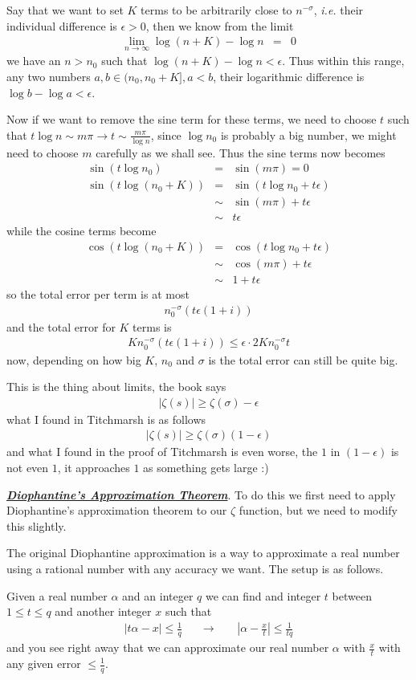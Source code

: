 \documentclass[aps,preprint,preprintnumbers,nofootinbib,showpacs,prd]{revtex4-1}
\newcommand{\ie}{{\it i.e.} }
\newcommand{\nbea}{\begin{eqnarray*}}
\newcommand{\neea}{\end{eqnarray*}}
\begin{document}
Say that we want to set $K$ terms to be arbitrarily close to $n^{-\sigma}$, \ie their individual difference is $\epsilon > 0$, then we know from the limit
%
\nbea
\lim_{n\to\infty} \log (n + K) - \log n & = & 0
\neea
%
we have an $n > n_0$ such that $\log (n + K) - \log n < \epsilon$. Thus within this range, any two numbers $a,b \in (n_0, n_0 + K], a < b$, their logarithmic difference is $\log b - \log a < \epsilon$.

Now if we want to remove the sine term for these terms, we need to choose $t$ such that $t \log n \sim m\pi \to t \sim\frac{m\pi}{\log n}$, since $\log n_0$ is probably a big number, we might need to choose $m$ carefully as we shall see. Thus the sine terms now becomes
%
\nbea
\sin(t \log n_0) & = & \sin (m\pi) = 0 \\
\sin(t \log (n_0 + K)) & = & \sin (t \log n_0 + t\epsilon) \\
& \sim & \sin(m\pi) + t\epsilon \\
& \sim & t\epsilon
\neea
%
while the cosine terms become
%
\nbea
\cos(t \log (n_0 + K)) & = & \cos(t \log n_0 + t\epsilon) \\
& \sim & \cos(m\pi) + t\epsilon \\
& \sim & 1 + t\epsilon
\neea
%
so the total error per term is at most
%
\nbea
n_0^{-\sigma}(t\epsilon(1 + i))
\neea
%
and the total error for $K$ terms is
%
\nbea
K n_0^{-\sigma}(t\epsilon(1 + i)) \le \epsilon \cdot 2 K n_0^{-\sigma} t 
\neea
%
now, depending on how big $K$, $n_0$ and $\sigma$ is the total error can still be quite big.







This is the thing about limits, the book says
%
\nbea
|\zeta(s)| \ge \zeta(\sigma) - \epsilon
\neea
%
what I found in Titchmarsh is as follows
%
\nbea
|\zeta(s)| \ge \zeta(\sigma)(1 - \epsilon)
\neea
%
and what I found in the proof of Titchmarsh is even worse, the $1$ in $(1 - \epsilon)$ is not even $1$, it approaches $1$ as something gets large :)

\underline{\textbf{\textit{Diophantine's Approximation Theorem}}}. To do this we first need to apply Diophantine's approximation theorem to our $\zeta$ function, but we need to modify this slightly.

The original Diophantine approximation is a way to approximate a real number using a rational number with any accuracy we want. The setup is as follows.

Given a real number $\alpha$ and an integer $q$ we can find and integer $t$ between $1 \le t \le q$ and another integer $x$ such that
%
\nbea
|t \alpha - x| \le \frac{1}{q} ~~~~~~~ \longrightarrow ~~~~~~~~\left | \alpha - \frac{x}{t} \right | \le \frac{1}{tq}
\neea
%
and you see right away that we can approximate our real number $\alpha$ with $\frac{x}{t}$ with any given error $\le \frac{1}{q}$.
\end{document}

